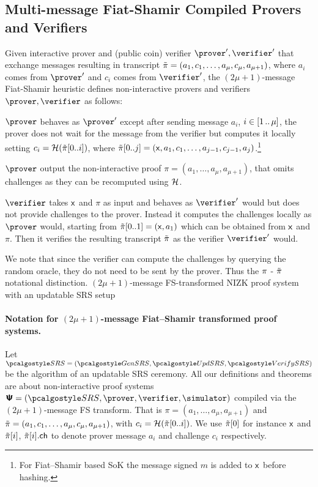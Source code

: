 \subsection{Multi-message Fiat-Shamir Compiled Provers and Verifiers}
Given interactive prover and (public coin) verifier $\prover', \verifier'$ that exchange messages resulting in transcript $\tilde{\pi} = (a_1, c_1, \ldots, a_{\mu}, c_{\mu}, a_{\mu + 1})$, where $a_i$ comes from
$\prover'$ and $c_i$ comes from $\verifier'$, the $(2\mu + 1)$-message Fiat-Shamir heuristic defines non-interactive provers and verifiers $\prover, \verifier$ as follows:

\begin{compactitem}
	\item $\prover$ behaves as $\prover'$ except after sending message
	  $a_i$, $i \in [1 \, .. \, \mu]$, the prover does not wait for
	  the message from the verifier but computes it locally setting $c_i
	  = \mathcal{H}(\tilde{\pi}[0..i])$, where $\tilde{\pi}[0..j] = (\mathsf{x}, a_1, c_1, \ldots,
	  a_{j - 1}, c_{j - 1}, a_j)$.\footnote{For Fiat--Shamir based SoK the message signed $m$ is added to $\mathsf{x}$ before hashing.} 
	  
	  $\prover$ output the non-interactive proof $\pi=(a_1,\ldots, a_{\mu}, a_{\mu + 1})$, that omits challenges as they can be recomputed using $\mathcal{H}$.

	\item $\verifier$ takes $\mathsf{x}$ and $\pi$ as input and behaves as $\verifier'$ would but does not provide
	  challenges to the prover. Instead it computes the
	  challenges locally as $\prover$ would, starting from $\tilde{\pi}[0..1]=(\mathsf{x},a_1)$ which can be obtained from $\mathsf{x}$ and $\pi$. Then it verifies the
	  resulting transcript $\tilde{\pi}$ as the verifier $\verifier'$ would. 
	\end{compactitem}
	We note that since the verifier can compute the challenges by querying the random oracle, they do not need to be sent by the prover. Thus the $\pi$ - $\tilde{\pi}$ notational distinction.
$(2\mu + 1)$-message FS-transformed NIZK proof system with an updatable SRS setup
\paragraph{Notation for $(2\mu + 1)$-message Fiat--Shamir transformed proof systems.}
Let $\SRScer= (\kgen,\upd, \verifyCRS)$ be the algorithm of an updatable SRS ceremony.
All our definitions and theorems are about non-interactive proof systems $\ps = (\SRScer, \prover, \verifier, \simulator)$ compiled via the $(2\mu + 1)$-message FS transform. 
%
That is $\pi = (a_1, \ldots, a_{\mu}, a_{\mu + 1})$ and $\tilde{\pi} = (a_1, c_1, \ldots, a_{\mu}, c_{\mu}, a_{\mu + 1})$, with $c_i
= \mathcal{H}(\tilde{\pi}[0..i])$.
%
We use $\tilde{\pi}[0]$ for instance
$\mathsf{x}$  and $\tilde{\pi}[i]$, $\tilde{\pi}[i].\mathsf{ch}$ to denote prover
message $a_i$ and challenge $c_i$ respectively. %


